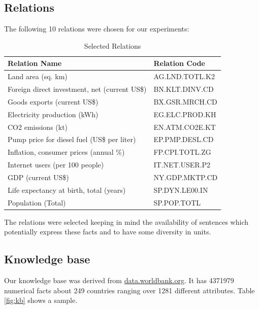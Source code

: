\documentclass[a4paper,10pt]{article}
\begin{document}
\subsection{Relations}
The following 10 relations were chosen for our experiments:
 \begin{center}
 \begin{table}[H]
\begin{tabular}{|l|l|}
\hline
Relation Name & Relation Code \\
\hline
Land area (sq. km)&AG.LND.TOTL.K2\\
Foreign direct investment, net (current US\$)&BN.KLT.DINV.CD\\
Goods exports (current US\$)&BX.GSR.MRCH.CD\\
Electricity production (kWh)&EG.ELC.PROD.KH\\
CO2 emissions (kt)&EN.ATM.CO2E.KT\\
Pump price for diesel fuel (US\$ per liter)&EP.PMP.DESL.CD\\
Inflation, consumer prices (annual \%)&FP.CPI.TOTL.ZG\\
Internet users (per 100 people)&IT.NET.USER.P2\\
GDP (current US\$)&NY.GDP.MKTP.CD\\
Life expectancy at birth, total (years)&SP.DYN.LE00.IN\\
Population (Total)&SP.POP.TOTL\\
\hline
\end{tabular}
\caption{Selected Relations}
\label{rels}
\end{table}
\end{center}

The relations were selected keeping in mind the availability of sentences which potentially express these facts
and to have some diversity in units.

\subsection{Knowledge base}
Our knowledge base was derived from \url{data.worldbank.org}.
It has 4371979 numerical facts about 249 countries ranging over 1281 different attributes. 
Table \ref{fig:kb} shows a sample.
\end{document}
